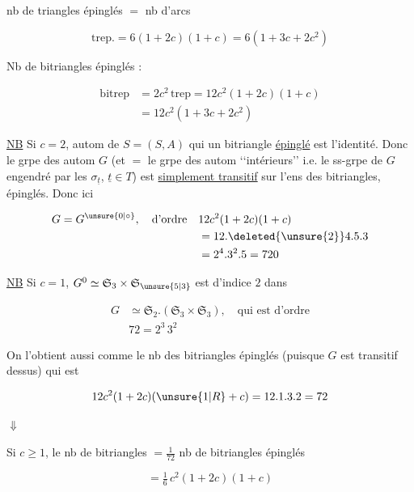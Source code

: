 nb de triangles épinglés $=$ nb d'arcs

\[ \mathrm{trep}.=6(1+2c)(1+c)=6(1+3c+2c^2) \]

Nb de bitriangles épinglés : 

\[
\begin{aligned}
\mathrm{bitrep}&=2c^2\,\mathrm{trep}=12c^2(1+2c)(1+c)\\
&=12c^2(1+3c+2c^2)
\end{aligned}
\]

\uline{NB} Si $c=2$,  autom de $S=(S,A)$ qui    un bitriangle \uline{épinglé} est l'identité. Donc le grpe des autom $G$ (et $=$ le grpe  des autom \lq\lq intérieurs\rq\rq{} i.e. le ss-grpe de $G$ engendré par les $\sigma_{\underline t}$, $\underline t\in T$) est \uline{simplement transitif} sur l'ens des bitriangles, épinglés. Donc ici

\[
\begin{aligned}
G=G^{\unsure{0|\circ}},\quad\text{d'ordre}\quad &12c^2(1+2c)(1+c)\\
&=12.\deleted{\unsure{2}}4.5.3\\
&=2^4.3^2.5=720
\end{aligned}
\]

\uline{NB} Si $c=1$, $G^0\simeq\mathfrak S_3\times\mathfrak S_{\unsure{5|3}}$ est d'indice $2$ dans

\[
\begin{aligned}
G&\simeq\mathfrak S_2.(\mathfrak S_3\times\mathfrak S_3),\quad\text{qui est d'ordre}\\
&72=2^3\,3^2
\end{aligned}
\]

On l'obtient aussi comme le nb des bitriangles épinglés (puisque $G$ est  transitif dessus) qui est

\[ 12c^2(1+2c)(\unsure{1|R}+c)=12.1.3.2=72 \]

$\Downarrow$

Si $c\geq1$, le nb de bitriangles $=\frac1{72}$ nb de bitriangles épinglés

\[ =\tfrac16\,c^2(1+2c)(1+c) \]


